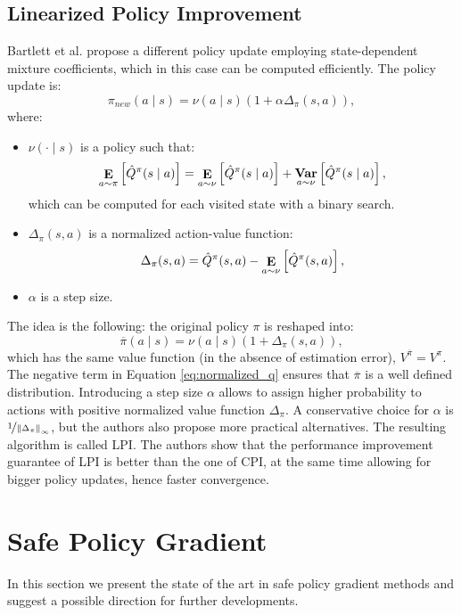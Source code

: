\subsection{Linearized Policy Improvement}
Bartlett et al. \cite{abbasi2016fast} propose a different policy update employing state-dependent mixture coefficients, which in this case can be computed efficiently.
The policy update is:
\[
	\pi_{new}(a \mid s) = \nu(a \mid s)(1+\alpha\Delta_{\pi}(s,a)),
\]
where:
\begin{itemize}
\item $\nu(\cdot \mid s)$ is a policy such that:
\begin{equation}\label{eq:same_value}
\expected{a}{\pi}{\hat{Q}^{\pi}(s \mid a)} = \expected{a}{\nu}{\hat{Q}^{\pi}(s \mid a)} + 
	\mathop{\mathbf{Var}}\limits_{a \sim \nu}\left[\hat{Q}^{\pi}(s \mid a)\right],
\end{equation}
which can be computed for each visited state with a binary search.
\item $\Delta_\pi(s,a)$ is a normalized action-value function:
\begin{equation}\label{eq:normalized_q}
	\Delta_\pi(s,a) = \hat{Q}^\pi(s,a) - \expected{a}{\nu}{\hat{Q}^\pi(s,a)},
\end{equation}
\item $\alpha$ is a step size.
\end{itemize}
The idea is the following: the original policy $\pi$ is reshaped into:
\[
	\overline{\pi}(a \mid s) = \nu(a \mid s)(1+\Delta_{\pi}(s,a)),
\]
which has the same value function (in the absence of estimation error), \ie $V^{\overline{\pi}} = V^\pi$. The negative term in Equation \ref{eq:normalized_q} ensures that $\overline{\pi}$ is a well defined distribution. Introducing a step size $\alpha$ allows to assign higher probability to actions with positive normalized value function $\Delta_\pi$. A conservative choice for $\alpha$ is $\nicefrac{1}{\norm[\infty]{\Delta_\pi}}$, but the authors also propose more practical alternatives.
The resulting algorithm is called \ac{LPI}. The authors show that the performance improvement guarantee of \ac{LPI} is better than the one of \ac{CPI}, at the same time allowing for bigger policy updates, hence faster convergence.

\section{Safe Policy Gradient}\label{sec:spg}
In this section we present the state of the art in safe policy gradient methods and suggest a possible direction for further developments.

